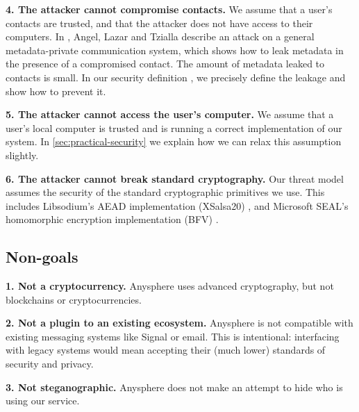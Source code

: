 \textbf{4. The attacker cannot compromise contacts.} We assume that a user's contacts are trusted, and that the attacker does not have access to their computers. In \cite{angel2018s}, Angel, Lazar and Tzialla describe an attack on a general metadata-private communication system, which shows how to leak metadata in the presence of a compromised contact. The amount of metadata leaked to contacts is small. In our security definition \cite{LAZ22SecDef}, we precisely define the leakage and show how to prevent it.

\textbf{5. The attacker cannot access the user's computer.} We assume that a user's local computer is trusted and is running a correct implementation of our system. In \cref{sec:practical-security} we explain how we can relax this assumption slightly.

\textbf{6. The attacker cannot break standard cryptography.} Our threat model assumes the security of the standard cryptographic primitives we use. This includes Libsodium's AEAD implementation (XSalsa20) \cite{libsodium}, and Microsoft SEAL's homomorphic encryption implementation (BFV) \cite{sealcrypto}.

\subsection{Non-goals}
\textbf{1. Not a cryptocurrency.} Anysphere uses advanced cryptography, but not blockchains or cryptocurrencies.

\textbf{2. Not a plugin to an existing ecosystem.} Anysphere is not compatible with existing messaging systems like Signal or email. This is intentional: interfacing with legacy systems would mean accepting their (much lower) standards of security and privacy.

\textbf{3. Not steganographic.} Anysphere does not make an attempt to hide who is using our service.


